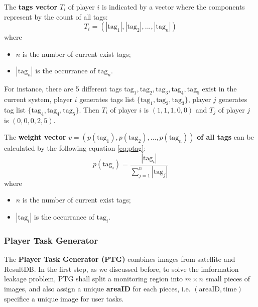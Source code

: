   \begin{definition}
  \label{def:tagv}
  The \textbf{tags vector} $T_i$ of player $i$ is indicated by a vector where the components represent by the count of all tags:
  \[
    T_i = (|\text{tag}_1|, |\text{tag}_2|, ..., |\text{tag}_n|)
  \]
  where 
  \begin{itemize}
  \item $n$ is the number of current exist tags;
  \item $|\text{tag}_n|$ is the occurrance of $\text{tag}_n$.
  \end{itemize}
  \end{definition}
  For instance, there are 5 different tags $\text{tag}_1, \text{tag}_2, \text{tag}_3, \text{tag}_4, \text{tag}_5$ exist in the current system,
  player $i$ generates tags list $\{\text{tag}_1, \text{tag}_2, \text{tag}_3\}$, player $j$ generates tag list
  $\{\text{tag}_4, \text{tag}_4, \text{tag}_5\}$. Then $T_i$ of player $i$ is $(1, 1, 1, 0, 0)$ and $T_j$ of player $j$ is $(0, 0, 0, 2, 5)$.

  \begin{definition}
  \label{def:weightv}
  The \textbf{weight vector} $v = (p(\text{tag}_1), p(\text{tag}_2), ..., p(\text{tag}_n))$ \textbf{of all tags} 
  can be calculated by the following equation \ref{eq:ptag}:
  \begin{equation}
  \label{eq:ptag}
  p(\text{tag}_i) = \frac{|\text{tag}_i|}{\sum_{j=1}^{n}{|\text{tag}_j|}}
  \end{equation}
  where
  \begin{itemize}
  \item $n$ is the number of current exist tags;
  \item $|\text{tag}_i|$ is the occurrance of $\text{tag}_i$.
  \end{itemize}
  \end{definition}

\subsubsection{Player Task Generator}

  The \textbf{Player Task Generator (PTG)} combines images from satellite and ResultDB. 
  In the first step, as we discussed before, to solve the imformation leakage problem,
  PTG shall split a monitoring region into $m\times n$ small pieces of images, and also assign a 
  unique \textbf{areaID} for each pieces, i.e. $(\text{areaID}, \text{time})$ 
  specifice a unique image for user tasks. 

